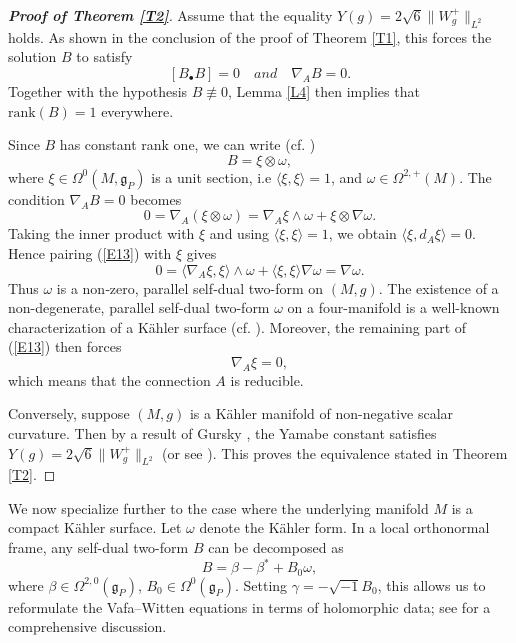 \documentclass[12pt, twoside]{article}
\theoremstyle{definition}
\numberwithin{equation}{section}
\def \b {\beta}
\def\w {\omega}
\def\Om{\Omega}
\def\na {\nabla}
\begin{document}
\begin{proof}[\textbf{Proof of Theorem \ref{T2}}]
Assume that the equality $Y(g)=2\sqrt{6}\|W^{+}_{g}\|_{L^{2}}$ holds. As shown in the conclusion of the proof of Theorem \ref{T1}, this forces the solution $B$ to satisfy
\[[B_{\bullet}B]=0\quad and\quad \na_{A}B=0.\]
Together with the hypothesis $B\not\equiv0$, Lemma \ref{L4} then implies that $\mathrm{rank}(B)=1$ everywhere.	

Since $B$ has constant rank one, we can write  (cf. \cite[Lemma 4.3.25]{DK90})
$$B=\xi\otimes\w,$$
where $\xi\in\Om^{0}(M,\mathfrak{g}_{P})$ is a unit section, i.e $\langle\xi,\xi\rangle=1$, and $\w\in\Om^{2,+}(M)$. The condition $\na_{A}B=0$ becomes
\begin{equation}\label{E13}
0=\na_{A}(\xi\otimes\w)=\na_{A}\xi\wedge\w+\xi\otimes \na\w.
\end{equation}
Taking the inner product with $\xi$ and using $\langle\xi,\xi\rangle=1$, we obtain $\langle\xi,d_{A}\xi\rangle=0$. Hence pairing (\ref{E13}) with $\xi$ gives
\begin{equation*}
0=\langle\na_{A}\xi,\xi\rangle\wedge\w+\langle\xi,\xi\rangle\na\w=\na\w.
\end{equation*}
Thus $\w$ is a non‑zero, parallel self‑dual two-form on $(M,g)$. The existence of a non-degenerate, parallel self-dual two-form $\w$ on a four-manifold is a well-known characterization of a Kähler surface (cf. \cite[Theorem 3.3]{Gur00}). Moreover, the remaining part of (\ref{E13}) then forces 
$$\na_{A}\xi=0,$$ 
which means that the connection $A$ is reducible. 

Conversely, suppose $(M,g)$ is a K\"{a}hler manifold of non-negative scalar curvature. Then by a result of Gursky \cite[Theorem 3.3 (ii)]{Gur00}, the Yamabe constant satisfies $Y(g)=2\sqrt{6}\|W^{+}_{g}\|_{L^{2}}$ (or see \cite{De83}). This proves the equivalence stated in Theorem \ref{T2}.
\end{proof}

We now specialize further to the case where the underlying manifold $M$ is a compact Kähler surface. 
Let $\w$ denote the Kähler form. In a local orthonormal frame, any self-dual two-form $B$ can be decomposed as 
\[ B=\b-\b^{\ast}+B_{0}\w,\]
where $\b\in\Om^{2,0}(\mathfrak{g}_{P})$, $B_{0}\in\Om^{0}(\mathfrak{g}_{P})$. 
Setting $\gamma=-\sqrt{-1}B_{0}$, this allows us to reformulate the Vafa--Witten equations in terms of holomorphic data; 
see \cite[Chapter 7]{Mar10} for a comprehensive discussion.
\end{document}
